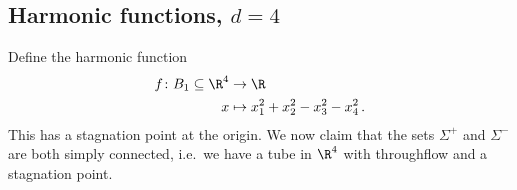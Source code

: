 

\newpage

\subsection{Harmonic functions, $d=4$} 
Define the harmonic function 
\begin{align*}
  f\colon B_1\subseteq\R^4&\to \R \\
  x &\mapsto x_1^2+x_2^2-x_3^2-x_4^2\,.
\end{align*}
This has a stagnation point at the origin. We now claim that the sets $\Sigma^+$ and $\Sigma^-$ are both simply connected, i.e.\
we have a tube in $\R^4$ with throughflow and a stagnation point.

